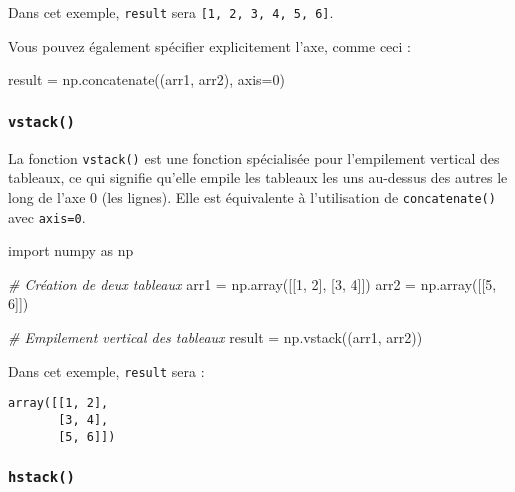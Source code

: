\documentclass[11pt]{article}
\newenvironment{Shaded}{}{}
\newcommand{\DecValTok}[1]{\textcolor[rgb]{0.25,0.63,0.44}{{#1}}}
\newcommand{\CommentTok}[1]{\textcolor[rgb]{0.38,0.63,0.69}{\textit{{#1}}}}
\newcommand{\NormalTok}[1]{{#1}}
\newcommand{\ImportTok}[1]{{#1}}
\newcommand{\OperatorTok}[1]{\textcolor[rgb]{0.40,0.40,0.40}{{#1}}}
\begin{document}
Dans cet exemple, \texttt{result} sera
\texttt{{[}1,\ 2,\ 3,\ 4,\ 5,\ 6{]}}.

Vous pouvez également spécifier explicitement l'axe, comme ceci :

\begin{Shaded}
\begin{Highlighting}[]
\NormalTok{result }\OperatorTok{=}\NormalTok{ np.concatenate((arr1, arr2), axis}\OperatorTok{=}\DecValTok{0}\NormalTok{)}
\end{Highlighting}
\end{Shaded}

\hypertarget{vstack}{%
\subsubsection{\texorpdfstring{\texttt{vstack()}}{vstack()}}\label{vstack}}

La fonction \texttt{vstack()} est une fonction spécialisée pour
l'empilement vertical des tableaux, ce qui signifie qu'elle empile les
tableaux les uns au-dessus des autres le long de l'axe 0 (les lignes).
Elle est équivalente à l'utilisation de \texttt{concatenate()} avec
\texttt{axis=0}.

\begin{Shaded}
\begin{Highlighting}[]
\ImportTok{import}\NormalTok{ numpy }\ImportTok{as}\NormalTok{ np}

\CommentTok{\# Création de deux tableaux}
\NormalTok{arr1 }\OperatorTok{=}\NormalTok{ np.array([[}\DecValTok{1}\NormalTok{, }\DecValTok{2}\NormalTok{], [}\DecValTok{3}\NormalTok{, }\DecValTok{4}\NormalTok{]])}
\NormalTok{arr2 }\OperatorTok{=}\NormalTok{ np.array([[}\DecValTok{5}\NormalTok{, }\DecValTok{6}\NormalTok{]])}

\CommentTok{\# Empilement vertical des tableaux}
\NormalTok{result }\OperatorTok{=}\NormalTok{ np.vstack((arr1, arr2))}
\end{Highlighting}
\end{Shaded}

Dans cet exemple, \texttt{result} sera :

\begin{verbatim}
array([[1, 2],
       [3, 4],
       [5, 6]])
\end{verbatim}

\hypertarget{hstack}{%
\subsubsection{\texorpdfstring{\texttt{hstack()}}{hstack()}}\label{hstack}}
\end{document}
